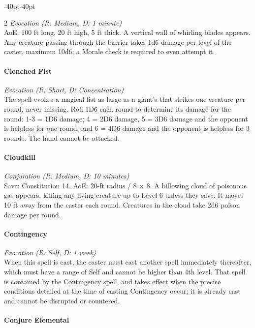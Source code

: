 \documentclass{book}
\begin{document}
\begin{adjustwidth}{-40pt}{-40pt}
\begin{multicols}{2}
\emph{Evocation (R: Medium, D: 1 minute)}\\
AoE: 100 ft long, 20 ft high, 5 ft thick. A vertical wall of whirling
blades appears. Any creature passing through the barrier takes 1d6
damage per level of the caster, maximum 10d6; a Morale check is required
to even attempt it.

\paragraph{Clenched Fist}\label{clenched-fist}

\emph{Evocation (R: Short, D: Concentration)}\\
The spell evokes a magical fist as large as a giant's that strikes one
creature per round, never missing. Roll 1D6 each round to determine its
damage for the round: 1-3 = 1D6 damage; 4 = 2D6 damage, 5 = 3D6 damage
and the opponent is helpless for one round, and 6 = 4D6 damage and the
opponent is helpless for 3 rounds. The hand cannot be attacked.

\paragraph{Cloudkill}\label{cloudkill}

\emph{Conjuration (R: Medium, D: 10 minutes)}\\
Save: Constitution 14. AoE: 20-ft radius / 8 × 8. A billowing cloud of
poisonous gas appears, killing any living creature up to Level 6 unless
they save. It moves 10 ft away from the caster each round. Creatures in
the cloud take 2d6 poison damage per round.

\paragraph{Contingency}\label{contingency}

\emph{Evocation (R: Self, D: 1 week)}\\
When this spell is cast, the caster must cast another spell immediately
thereafter, which must have a range of Self and cannot be higher than
4th level. That spell is contained by the Contingency spell, and takes
effect when the precise conditions detailed at the time of casting
Contingency occur; it is already cast and cannot be disrupted or
countered.

\paragraph{Conjure Elemental}\label{conjure-elemental}


\end{multicols}
\end{adjustwidth}
\end{document}
